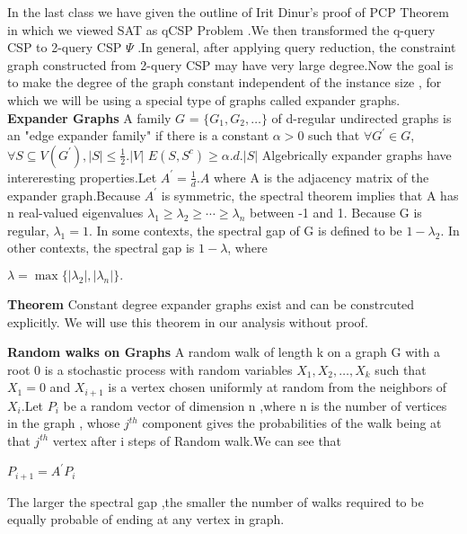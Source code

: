 In the last class we have given the outline of Irit Dinur's proof of PCP Theorem in which we viewed SAT as qCSP Problem .We then transformed the q-query CSP to 2-query CSP $\Psi$  .In general, after applying query reduction, the constraint graph constructed from 2-query CSP may have very large degree.Now the goal is to make the degree of the graph constant independent of the instance size , for which we will be using a special type of graphs called expander graphs.
\newline \textbf {Expander Graphs}
A family $G$ = $\{G_{1}, G_{2}, \ldots \}$ of d-regular undirected graphs is an "edge expander family" if there is a constant $\alpha > 0$ such that $\forall G^{'} \in G $, $\forall S\subseteq V(G^{'}) ,|S| \leqslant \frac{1}{2}.|V| $
\newline $E(S,S^c)\geqslant \alpha .d.|S|$
\newline Algebrically expander graphs have intereresting properties.Let $A^{'} = \frac{1}{d}.A$ where A is the adjacency matrix of the expander graph.Because $A^{'}$ is symmetric, the spectral theorem implies that A has n real-valued eigenvalues $\lambda_1 \ge \lambda_2 \ge \cdots \ge \lambda_{n} $ between -1 and 1. Because G is regular, $\lambda_1=1$. In some contexts, the spectral gap of G is defined to be $1-\lambda_2$. In other contexts, the spectral gap is $1-\lambda$, where

    $\lambda=\max\{|\lambda_2|, |\lambda_{n}|\}.$

\textbf {Theorem}
Constant degree expander graphs exist and can be constrcuted explicitly.
\newline We will use this theorem in our analysis without proof.

\textbf{Random walks on Graphs}
A random walk of length k on a  graph G with a root 0 is a stochastic process with random variables $X_1,X_2,\dots,X_k $ such that $X_1=0$ and ${X_{i+1}}$  is a vertex chosen uniformly at random from the neighbors of $X_i$.Let $P_{i}$ be a random vector of dimension n ,where n is the number of vertices in the graph , whose $j^{th}$ component  gives the probabilities of the walk being at that $j^{th}$ vertex after i steps of Random walk.We can see that 

$P_{i+1}=A^{'}P_{i}$

 
The larger the spectral gap ,the smaller the number of walks required to be equally probable of ending at any vertex in graph.

